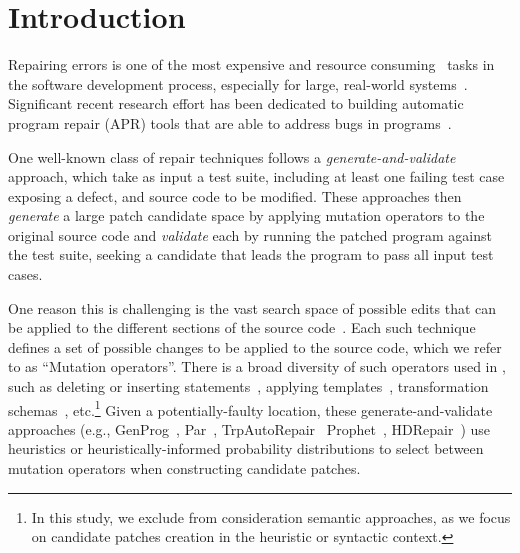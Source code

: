 \documentclass[conference]{IEEEtran}
\begin{document}
\section{Introduction} \label{introduction}
Repairing errors is one of the most expensive\cite{Tassey02,Britton13} and 
resource consuming~\cite{Weiss07} tasks in 
the software development process, especially for large, real-world systems~\cite{Liblit03,Anvik05}.
%
Significant recent research effort has been dedicated to
building automatic program repair (APR) tools that are able to address
bugs in 
programs~\cite{legoues12,kim2013,Weimer13,fan15,long16proph,debroy10,perkins09,wei10}. 

One well-known class of repair techniques follows a 
\emph{generate-and-validate} approach, which take as input a test suite, 
including at
least one failing test case exposing
a defect, and source code to be 
modified.  These approaches then \emph{generate} a large patch candidate space 
by applying 
mutation operators to the original source code and \emph{validate} each by
running the patched  program against the test suite, seeking a candidate that
leads the program to pass all input test cases. 

One reason this is challenging is the vast search space of possible 
edits that can be applied to the different sections of the source 
code~\cite{long16}. Each such technique defines  a set of possible changes to be
applied to the source code, which we refer to as ``Mutation operators''. 
There is a broad diversity of such operators used in , such as deleting or inserting 
statements~\cite{legoues12}, applying templates~\cite{kim2013}, transformation 
schemas~\cite{fan15SPR}, etc.\footnote{In this study, we exclude 
from 
consideration semantic approaches, as we focus on
candidate patches creation in the heuristic or syntactic context.} 
Given a potentially-faulty location, these
generate-and-validate approaches (e.g., GenProg~\cite{legoues12}, 
Par~\cite{kim2013}, TrpAutoRepair~\cite{Qi13TrpAutoR}
Prophet~\cite{long16proph}, HDRepair~\cite{xuan16}) use heuristics or
heuristically-informed probability distributions to select between
mutation operators
when constructing candidate patches.
\end{document}

